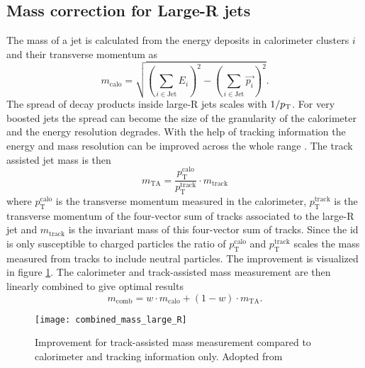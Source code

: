 \subsection{Mass correction for Large-R jets}
The mass of a jet is calculated from the energy deposits in calorimeter clusters $i$ and their transverse momentum as
\begin{equation}
  m_{\text{calo}} = \sqrt{\left(\sum_{i\in \text{Jet}}E_i\right)^2-\left(\sum_{i\in \text{Jet}}\vec{p_i}\right)^2}.
\end{equation}
The spread of decay products inside large-R jets scales with $1/p_{\text{T}}$. For very boosted jets the spread can become the size of the granularity of the calorimeter and the energy resolution degrades. With the help of tracking information the energy and mass resolution can be improved across the whole \pt range \citep{Aaboud:2019aa}. The track assisted jet mass is then
\begin{equation}
  m_{\text{TA}} = \frac{p_{\text{T}}^{\text{calo}}}{p_{\text{T}}^{\text{track}}} \cdot m_{\text{track}}
\end{equation}
where $p_{\text{T}}^{\text{calo}}$ is the transverse momentum measured in the calorimeter, $p_{\text{T}}^{\text{track}}$ is the transverse momentum of the four-vector sum of tracks associated to the large-R jet and $m_\text{track}$ is the invariant mass of this four-vector sum of tracks. Since the \ac{id} is only susceptible to charged particles the ratio of $p_{\text{T}}^{\text{calo}}$ and $p_{\text{T}}^{\text{track}}$ scales the mass measured from tracks to include neutral particles. The improvement is visualized in figure \ref{fig:combined_mass_large_R}. The calorimeter and track-assisted mass measurement are then linearly combined to give optimal results
\begin{equation}
  m_{\text{comb}} =  w\cdot m_{\text{calo}}+(1-w)\cdot m_{\text{TA}}.
\end{equation}
\begin{figure}
  \centering
  \texttt{[image: combined\_mass\_large\_R]}
  \caption[]{Improvement for track-assisted mass measurement compared to calorimeter and tracking information only. Adopted from \citep{ATLAS-CONF-2016-035} }
  \label{fig:combined_mass_large_R}
\end{figure}
